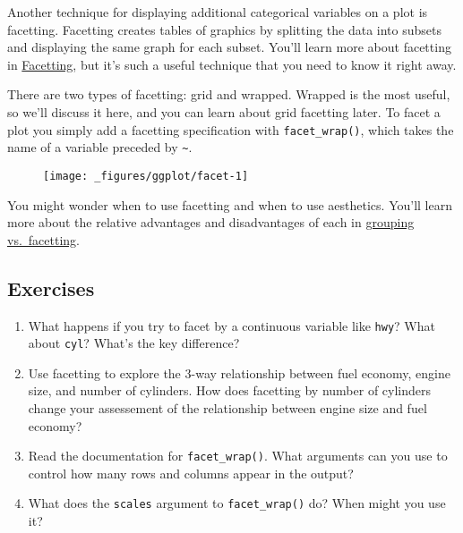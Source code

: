 Another technique for displaying additional categorical variables on a
plot is facetting. Facetting creates tables of graphics by splitting the
data into subsets and displaying the same graph for each subset. You'll
learn more about facetting in
\protect\hyperlink{sec:facetting}{Facetting}, but it's such a useful
technique that you need to know it right away. 

There are two types of facetting: grid and wrapped. Wrapped is the most
useful, so we'll discuss it here, and you can learn about grid facetting
later. To facet a plot you simply add a facetting specification with
\texttt{facet\_wrap()}, which takes the name of a variable preceded by
\texttt{\textasciitilde{}}. 

\begin{Shaded}
\begin{Highlighting}[]
\OperatorTok{+}\StringTok{ }
\StringTok{  }\NormalTok{() }\OperatorTok{+}\StringTok{ }
\StringTok{  }\NormalTok{(}\OperatorTok{~}
\end{Highlighting}
\end{Shaded}

\begin{figure}[H]
  \texttt{[image: \_figures/ggplot/facet-1]}
\end{figure}

You might wonder when to use facetting and when to use aesthetics.
You'll learn more about the relative advantages and disadvantages of
each in \protect\hyperlink{sub:group-vs-facet}{grouping vs.~facetting}.

\hypertarget{exercises-3}{%
\subsection{Exercises}\label{exercises-3}}

\begin{enumerate}
\def\labelenumi{\arabic{enumi}.}
\item
  What happens if you try to facet by a continuous variable like
  \texttt{hwy}? What about \texttt{cyl}? What's the key difference?
\item
  Use facetting to explore the 3-way relationship between fuel economy,
  engine size, and number of cylinders. How does facetting by number of
  cylinders change your assessement of the relationship between engine
  size and fuel economy?
\item
  Read the documentation for \texttt{facet\_wrap()}. What arguments can
  you use to control how many rows and columns appear in the output?
\item
  What does the \texttt{scales} argument to \texttt{facet\_wrap()} do?
  When might you use it?
\end{enumerate}

